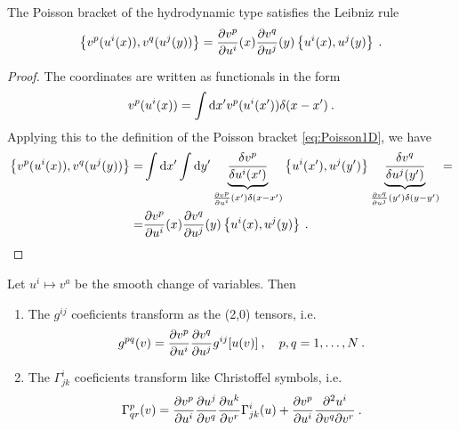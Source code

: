 \begin{proposition}
    The Poisson bracket of the hydrodynamic type satisfies the Leibniz rule
    \begin{align}
        \label{eq:transformace-zavorka}
        \left \lbrace v^p(u^i(x)),v^q(u^j(y)) \right \rbrace = \frac{\partial v^p}{\partial u^i}(x) \frac{\partial v^q}{\partial u^j}(y) \left \lbrace u^i(x),u^j(y) \right \rbrace \:. 
    \end{align}
\end{proposition}
\begin{proof}
    The coordinates are written as functionals in the form
    \begin{align}
        v^p(u^i(x)) = \int \mathrm{d} x' v^p(u^i(x')) \delta (x-x') \:.
    \end{align}
    Applying this to the definition of the Poisson bracket \eqref{eq:Poisson1D}, we have
    \begin{align}
        \left \lbrace v^p(u^i(x)),v^q(u^j(y)) \right \rbrace 
        =& \int \mathrm{d} x' \int \mathrm{d} y' \underbrace{\frac{\delta v^p}{\delta u^i(x')} }_{\frac{\partial v^p}{\partial u^i}(x') \delta(x-x')} \left \lbrace u^i(x'),u^j(y') \right \rbrace \underbrace{\frac{\delta v^q}{\delta u^j(y')} }_{\frac{\partial v^q}{\partial u^j}(y') \delta(y-y')}
        = \\ =& \frac{\partial v^p}{\partial u^i}(x) \frac{\partial v^q}{\partial u^j}(y) \left \lbrace u^i(x),u^j(y) \right \rbrace \:.
    \end{align}
\end{proof}


\begin{proposition} \label{prop:transoformace}
    Let $u^i \mapsto v^a$ be the smooth change of variables. Then
    \begin{enumerate}
        \item The $g^{ij}$ coeficients transform as the (2,0) tensors, i.e. 
        \begin{align}
            g^{pq}(v) = \frac{\partial v^p}{\partial u^i} \frac{\partial v^q}{\partial u^j} g^{ij}[u(v)] \:, \quad p, q = 1, \dots, N \:. \label{eq:transformace-metrika}
        \end{align}
        \item The $\Gamma^i_{jk}$ coeficients  transform like Christoffel symbols, i.e.
        \begin{align}
            \Gamma^p_{qr} (v) = \frac{\partial v^p}{\partial u^i} \frac{\partial u^j}{\partial v^q} \frac{\partial u^k}{\partial v^r} \Gamma^i_{jk}(u) + \frac{\partial v^p}{\partial u^i} \frac{\partial^2 u^i}{\partial v^q \partial v^r} \:. \label{eq:transformace-konexe}
        \end{align}
    \end{enumerate}
\end{proposition}

